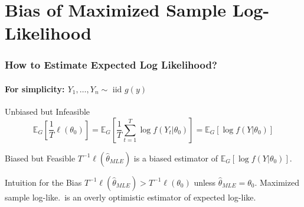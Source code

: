 \section{Bias of Maximized Sample Log-Likelihood} 
\begin{frame}
  \frametitle{How to Estimate Expected Log Likelihood?}
  \framesubtitle{For simplicity: $Y_1, \dots, Y_n \sim \mbox{ iid } g(y)$}


  \begin{block}{Unbiased but Infeasible}
    \[
      \mathbb{E}_G \left[\frac{1}{T}\ell(\theta_0)\right] = \mathbb{E}_G\left[ \frac{1}{T} \sum_{t=1}^T \log f(Y_t|\theta_0)\right] = \mathbb{E}_G\left[ \log f(Y|\theta_0) \right]
    \]
    
  \end{block}
   
  \pause

  \vspace{-1em}

  \begin{block}{Biased but Feasible}
    $T^{-1}\ell(\widehat{\theta}_{MLE})$ is a \alert{biased} estimator of $\mathbb{E}_G[\log f(Y|\theta_0)]$. 
  \end{block}

  \pause

  \begin{block}{Intuition for the Bias}
    $T^{-1}\ell(\widehat{\theta}_{MLE}) > T^{-1}\ell(\theta_0)$ unless $\widehat{\theta}_{MLE} = \theta_0$. 
    Maximized sample log-like.\ is an \alert{overly optimistic} estimator of expected log-like.
  \end{block}

\end{frame}
